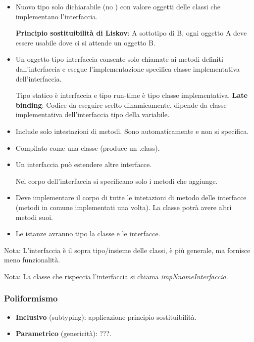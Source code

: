 \begin{itemize}
	\item Nuovo tipo solo dichiarabile (no ) con valore oggetti delle classi che implementano l'interfaccia.

	\textbf{Principio sostituibilità di Liskov}: A sottotipo di B, ogni oggetto A deve essere usabile dove ci si attende un oggetto B.
	\item Un oggetto tipo interfaccia consente solo chiamate ai metodi definiti dall'interfaccia e esegue l'implementazione specifica classe implementativa dell'interfaccia.


	Tipo statico è interfaccia e tipo run-time è tipo classe implementativa.
	\textbf{Late binding}: Codice da eseguire scelto dinamicamente, dipende da classe implementativa dell'interfaccia tipo della variabile.

	\item Include solo intestazioni di metodi. Sono automaticamente  e non si specifica.
	\item Compilato come una classe (produce un .class).

	\item Un interfaccia può estendere altre interfacce.


	Nel corpo dell'interfaccia si specificano solo i metodi che aggiunge.
\end{itemize}


\begin{itemize}
	\item Deve implementare il corpo di tutte le intetazioni di metodo delle interfacce (metodi in comune implementati una volta). La classe potrà avere altri metodi suoi.
	\item Le istanze avranno tipo la classe e le interfacce.
\end{itemize}

Nota: L'interfaccia è il sopra tipo/insieme delle classi, è più generale, ma fornisce meno funzionalità.

Nota: La classe che rispeccia l'interfaccia si chiama \textit{impNnomeInterfaccia}.

\subsubsection{Poliformismo}
\begin{itemize}
	\item \textbf{Inclusivo} (subtyping): applicazione principio sostituibilità.
	\item \textbf{Parametrico} (genericità): ???.
\end{itemize}


